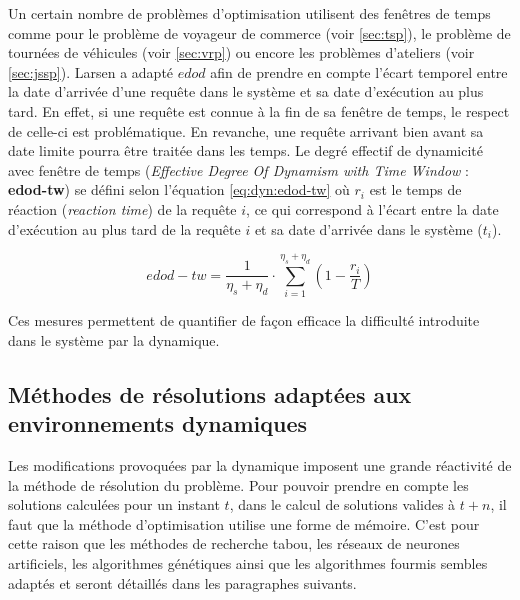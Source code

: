 Un certain nombre de problèmes d'optimisation utilisent des fenêtres de temps comme pour le problème de voyageur de commerce (voir \ref{sec:tsp}), le problème de tournées de véhicules (voir \ref{sec:vrp}) ou encore les problèmes d'ateliers (voir \ref{sec:jssp}). Larsen a adapté $edod$ afin de prendre en compte l'écart temporel entre la date d'arrivée d'une requête dans le système et sa date d'exécution au plus tard. En effet, si une requête est connue à la fin de sa fenêtre de temps, le respect de celle-ci est problématique. En revanche, une requête arrivant bien avant sa date limite pourra être traitée dans les temps. Le degré effectif de dynamicité avec fenêtre de temps (\textit{Effective Degree Of Dynamism with Time Window} : \textbf{edod-tw}) se défini selon l'équation \ref{eq:dyn:edod-tw} où $r_i$ est le temps de réaction (\textit{reaction time}) de la requête $i$, ce qui correspond à l'écart entre la date d'exécution au plus tard de la requête $i$ et sa date d'arrivée dans le système ($t_i$).
\begin{figure*}[h]
 \begin{equation}
    \label{eq:dyn:edod-tw}
    edod-tw = \frac{1}{\eta_s+\eta_d} \cdot \sum \limits_{i=1}^{\eta_s+\eta_d} \left( 1 - \frac{r_i}{T} \right)
 \end{equation}
\end{figure*} 

Ces mesures permettent de quantifier de façon efficace la difficulté introduite dans le système par la dynamique.

\subsection{Méthodes de résolutions adaptées aux environnements dynamiques}

Les modifications provoquées par la dynamique imposent une grande réactivité de la méthode de résolution du problème. Pour pouvoir prendre en compte les solutions calculées pour un instant $t$, dans le calcul de solutions valides à $t+n$, il faut que la méthode d'optimisation utilise une forme de mémoire. C'est pour cette raison que les méthodes de recherche tabou, les réseaux de neurones artificiels, les algorithmes génétiques ainsi que les algorithmes fourmis sembles adaptés et seront détaillés dans les paragraphes suivants.

